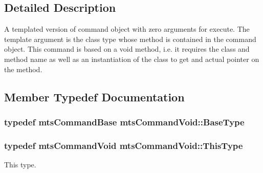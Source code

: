 \subsection{Detailed Description}
A templated version of command object with zero arguments for execute. The template argument is the class type whose method is contained in the command object. This command is based on a void method, i.\-e. it requires the class and method name as well as an instantiation of the class to get and actual pointer on the method. 

\subsection{Member Typedef Documentation}
\hypertarget{classmts_command_void_aa0e2be86c520aef7b9c3a59e3cfbbce3}{
\subsubsection[{Base\-Type}]{\setlength{\rightskip}{0pt plus 5cm}typedef {\bf mts\-Command\-Base} {\bf mts\-Command\-Void\-::\-Base\-Type}}}\label{classmts_command_void_aa0e2be86c520aef7b9c3a59e3cfbbce3}
\hypertarget{classmts_command_void_ae909e0b365485d0923193cec9331f8ce}{
\subsubsection[{This\-Type}]{\setlength{\rightskip}{0pt plus 5cm}typedef {\bf mts\-Command\-Void} {\bf mts\-Command\-Void\-::\-This\-Type}}}\label{classmts_command_void_ae909e0b365485d0923193cec9331f8ce}
This type. 

